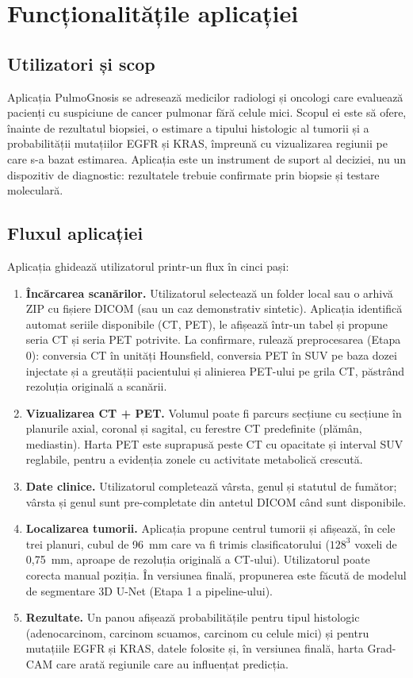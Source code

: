\documentclass[11pt, a4paper]{article}
\begin{document}
\section{Funcționalitățile aplicației}

\subsection{Utilizatori și scop}
Aplicația PulmoGnosis se adresează medicilor radiologi și oncologi care evaluează pacienți cu suspiciune de cancer pulmonar fără celule mici. Scopul ei este să ofere, înainte de rezultatul biopsiei, o estimare a tipului histologic al tumorii și a probabilității mutațiilor EGFR și KRAS, împreună cu vizualizarea regiunii pe care s-a bazat estimarea. Aplicația este un instrument de suport al deciziei, nu un dispozitiv de diagnostic: rezultatele trebuie confirmate prin biopsie și testare moleculară.

\subsection{Fluxul aplicației}
Aplicația ghidează utilizatorul printr-un flux în cinci pași:

\begin{enumerate}
    \item \textbf{Încărcarea scanărilor.} Utilizatorul selectează un folder local sau o arhivă ZIP cu fișiere DICOM (sau un caz demonstrativ sintetic). Aplicația identifică automat seriile disponibile (CT, PET), le afișează într-un tabel și propune seria CT și seria PET potrivite. La confirmare, rulează preprocesarea (Etapa 0): conversia CT în unități Hounsfield, conversia PET în SUV pe baza dozei injectate și a greutății pacientului și alinierea PET-ului pe grila CT, păstrând rezoluția originală a scanării.
    \item \textbf{Vizualizarea CT + PET.} Volumul poate fi parcurs secțiune cu secțiune în planurile axial, coronal și sagital, cu ferestre CT predefinite (plămân, mediastin). Harta PET este suprapusă peste CT cu opacitate și interval SUV reglabile, pentru a evidenția zonele cu activitate metabolică crescută.
    \item \textbf{Date clinice.} Utilizatorul completează vârsta, genul și statutul de fumător; vârsta și genul sunt pre-completate din antetul DICOM când sunt disponibile.
    \item \textbf{Localizarea tumorii.} Aplicația propune centrul tumorii și afișează, în cele trei planuri, cubul de 96~mm care va fi trimis clasificatorului ($128^3$ voxeli de 0,75~mm, aproape de rezoluția originală a CT-ului). Utilizatorul poate corecta manual poziția. În versiunea finală, propunerea este făcută de modelul de segmentare 3D U-Net (Etapa 1 a pipeline-ului).
    \item \textbf{Rezultate.} Un panou afișează probabilitățile pentru tipul histologic (adenocarcinom, carcinom scuamos, carcinom cu celule mici) și pentru mutațiile EGFR și KRAS, datele folosite și, în versiunea finală, harta Grad-CAM care arată regiunile care au influențat predicția.
\end{enumerate}
\end{document}
